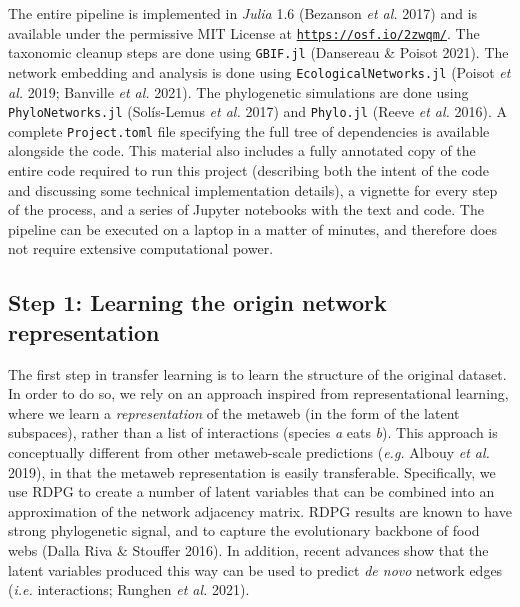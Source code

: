 \documentclass[11pt]{article}
\begin{document}
The entire pipeline is implemented in \emph{Julia} 1.6 (Bezanson
\emph{et al.} 2017) and is available under the permissive MIT License at
\href{https://osf.io/2zwqm/}{\texttt{https://osf.io/2zwqm/}}. The
taxonomic cleanup steps are done using \texttt{GBIF.jl} (Dansereau \&
Poisot 2021). The network embedding and analysis is done using
\texttt{EcologicalNetworks.jl} (Poisot \emph{et al.} 2019; Banville
\emph{et al.} 2021). The phylogenetic simulations are done using
\texttt{PhyloNetworks.jl} (Solís-Lemus \emph{et al.} 2017) and
\texttt{Phylo.jl} (Reeve \emph{et al.} 2016). A complete
\texttt{Project.toml} file specifying the full tree of dependencies is
available alongside the code. This material also includes a fully
annotated copy of the entire code required to run this project
(describing both the intent of the code and discussing some technical
implementation details), a vignette for every step of the process, and a
series of Jupyter notebooks with the text and code. The pipeline can be
executed on a laptop in a matter of minutes, and therefore does not
require extensive computational power.

\hypertarget{step-1-learning-the-origin-network-representation}{%
\subsection{Step 1: Learning the origin network
representation}\label{step-1-learning-the-origin-network-representation}}

The first step in transfer learning is to learn the structure of the
original dataset. In order to do so, we rely on an approach inspired
from representational learning, where we learn a \emph{representation}
of the metaweb (in the form of the latent subspaces), rather than a list
of interactions (species \emph{a} eats \emph{b}). This approach is
conceptually different from other metaweb-scale predictions (\emph{e.g.}
Albouy \emph{et al.} 2019), in that the metaweb representation is easily
transferable. Specifically, we use RDPG to create a number of latent
variables that can be combined into an approximation of the network
adjacency matrix. RDPG results are known to have strong phylogenetic
signal, and to capture the evolutionary backbone of food webs (Dalla
Riva \& Stouffer 2016). In addition, recent advances show that the
latent variables produced this way can be used to predict \emph{de novo}
network edges (\emph{i.e.} interactions; Runghen \emph{et al.} 2021).
\end{document}

